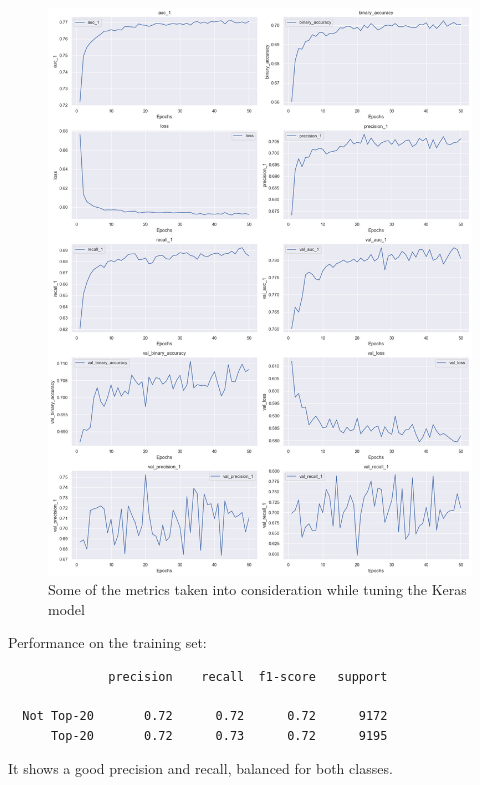 \documentclass{article}
\begin{document}
\begin{figure}[H]
    \centering
    \includegraphics[width=1.0\linewidth]{kerasmetrics.png}
    \caption{Some of the metrics taken into consideration while tuning the Keras model}
    \label{fig:kerasmetrics}
\end{figure}



Performance on the training set:
\begin{verbatim}
              precision    recall  f1-score   support

  Not Top-20       0.72      0.72      0.72      9172
      Top-20       0.72      0.73      0.72      9195
\end{verbatim}
It shows a good precision and recall, balanced for both classes.
\end{document}
